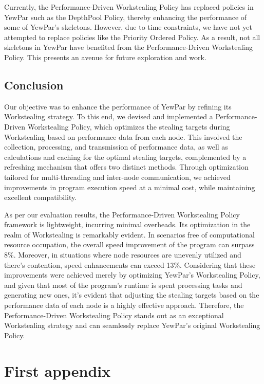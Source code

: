 \documentclass{mproj}
\begin{document}
Currently, the Performance-Driven Workstealing Policy has replaced policies in YewPar such as the DepthPool Policy,
thereby enhancing the performance of some of YewPar's skeletons.
However, due to time constraints, we have not yet attempted to replace policies like the Priority Ordered Policy.
As a result, not all skeletons in YewPar have benefited from the Performance-Driven Workstealing Policy.
This presents an avenue for future exploration and work.

\section{Conclusion}
Our objective was to enhance the performance of YewPar by refining its Workstealing strategy.
To this end, we devised and implemented a Performance-Driven Workstealing Policy,
which optimizes the stealing targets during Workstealing based on performance data from each node.
This involved the collection, processing, and transmission of performance data,
as well as calculations and caching for the optimal stealing targets,
complemented by a refreshing mechanism that offers two distinct methods.
Through optimization tailored for multi-threading and inter-node communication,
we achieved improvements in program execution speed at a minimal cost,
while maintaining excellent compatibility.

As per our evaluation results,
the Performance-Driven Workstealing Policy framework is lightweight, incurring minimal overheads.
Its optimization in the realm of Workstealing is remarkably evident.
In scenarios free of computational resource occupation,
the overall speed improvement of the program can surpass 8\%.
Moreover, in situations where node resources are unevenly utilized and there's contention,
speed enhancements can exceed 13\%.
Considering that these improvements were achieved merely by optimizing YewPar's Workstealing Policy,
and given that most of the program's runtime is spent processing tasks and generating new ones,
it's evident that adjusting the stealing targets based on the performance data of each node is a highly effective approach.
Therefore, the Performance-Driven Workstealing Policy stands out as an exceptional Workstealing strategy
and can seamlessly replace YewPar's original Workstealing Policy.


\appendix %
\chapter{First appendix}
\end{document}
